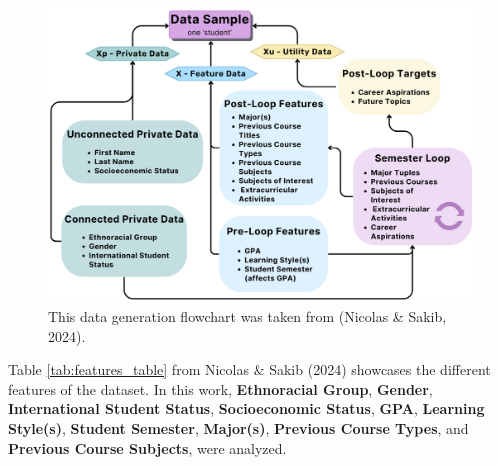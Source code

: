 \documentclass{article}
\begin{document}
\begin{figure}

{\centering \includegraphics[width=0.9\linewidth]{data_generation_flowchart} 

}

\caption{This data generation flowchart was taken from (Nicolas \& Sakib, 2024).\label{fig:data_generation}}\label{fig:nicolas2024}
\end{figure}

Table \ref{tab:features_table} from Nicolas \& Sakib (2024) showcases the different features of the dataset. In this work, \textbf{Ethnoracial Group}, \textbf{Gender}, \textbf{International Student Status}, \textbf{Socioeconomic Status}, \textbf{GPA}, \textbf{Learning Style(s)}, \textbf{Student Semester}, \textbf{Major(s)}, \textbf{Previous Course Types}, and \textbf{Previous Course Subjects}, were analyzed.
\end{document}
